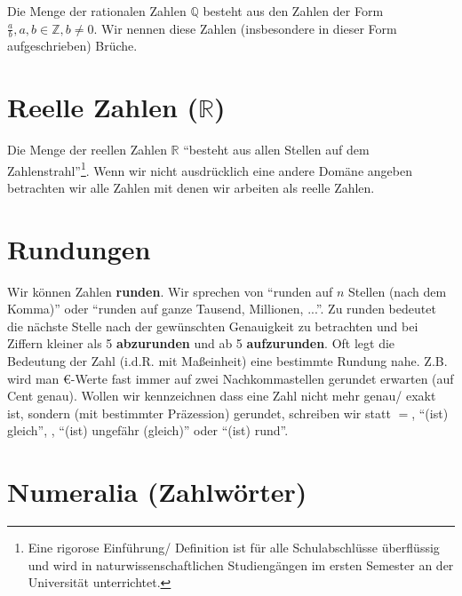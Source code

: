 \documentclass[a4paper]{book}%
\theoremstyle{definition}
\begin{document}
Die Menge der rationalen Zahlen $\mathbb{Q}$ besteht aus den Zahlen der Form $\frac{a}{b}, a, b \in \mathbb{Z}, b \neq 0$. Wir nennen diese Zahlen (insbesondere in dieser Form aufgeschrieben) Brüche.


\section{Reelle Zahlen ($\mathbb{R}$)}

Die Menge der reellen Zahlen $\mathbb{R}$ \enquote{besteht aus allen Stellen auf dem Zahlenstrahl}\footnote{Eine rigorose Einführung/ Definition ist für alle Schulabschlüsse überflüssig und wird in naturwissenschaftlichen Studiengängen im ersten Semester an der Universität unterrichtet.}. Wenn wir nicht ausdrücklich eine andere Domäne angeben betrachten wir alle Zahlen mit denen wir arbeiten als reelle Zahlen.


\section{Rundungen}

Wir können Zahlen \textbf{runden}. Wir sprechen von \enquote{runden auf $n$ Stellen (nach dem Komma)} oder \enquote{runden auf ganze Tausend, Millionen, ...}. Zu runden bedeutet die nächste Stelle nach der gewünschten Genauigkeit zu betrachten und bei Ziffern kleiner als 5 \textbf{abzurunden} und ab 5 \textbf{aufzurunden}. Oft legt die Bedeutung der Zahl (i.d.R. mit Maßeinheit) eine bestimmte Rundung nahe. Z.B. wird man €-Werte fast immer auf zwei Nachkommastellen gerundet erwarten (auf Cent genau). Wollen wir kennzeichnen dass eine Zahl nicht mehr genau/ exakt ist, sondern (mit bestimmter Präzession) gerundet, schreiben wir statt $=$, \enquote{(ist) gleich}, , \enquote{(ist) ungefähr (gleich)} oder \enquote{(ist) rund}.


\section{Numeralia (Zahlwörter)}\label{numeralia}
\end{document}
